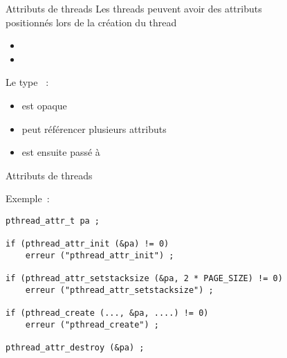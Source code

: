 \begin {frame} {Attributs de threads}
    Les threads peuvent avoir des attributs \\
    \implique positionnés lors de la création du thread

    \begin {itemize}
	\item {}
	\item {}
    \end {itemize}

    \vspace* {3mm}

    Le type ~:
    \begin {itemize}
	\item est opaque
	\item peut référencer plusieurs attributs
	\item est ensuite passé à 
    \end {itemize}
\end {frame}

\begin {frame} [fragile] {Attributs de threads}

Exemple~:

\begin {lstlisting}
pthread_attr_t pa ;

if (pthread_attr_init (&pa) != 0)
    erreur ("pthread_attr_init") ;

if (pthread_attr_setstacksize (&pa, 2 * PAGE_SIZE) != 0)
    erreur ("pthread_attr_setstacksize") ;

if (pthread_create (..., &pa, ....) != 0)
    erreur ("pthread_create") ;

pthread_attr_destroy (&pa) ;
\end{lstlisting}
\end{frame}





